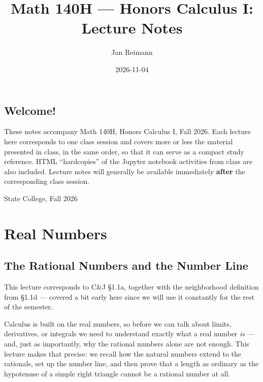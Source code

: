\documentclass[
  letterpaper,
  DIV=11,
  numbers=noendperiod]{scrreprt}
\title{Math 140H --- Honors Calculus I: Lecture Notes}
\author{Jan Reimann}
\date{2026-11-04}
\renewcommand*\contentsname{Table of contents}
\newcommand\contentsname{Table of contents}
\theoremstyle{plain}
\theoremstyle{plain}
\theoremstyle{definition}
\theoremstyle{definition}
\theoremstyle{definition}
\theoremstyle{plain}
\theoremstyle{plain}
\theoremstyle{remark}
\begin{document}
\maketitle

\renewcommand*\contentsname{Table of contents}
{
\setcounter{tocdepth}{1}
\tableofcontents
}


\chapter*{Welcome!}\label{welcome}


These notes accompany Math 140H, Honors Calculus I, Fall 2026. Each
lecture here corresponds to one class session and covers more or less
the material presented in class, in the same order, so that it can serve
as a compact study reference. HTML ``hardcopies'' of the Jupyter
notebook activities from class are also included. Lecture notes will
generally be available immediately \textbf{after} the corresponding
class session.

State College, Fall 2026

\part{Real Numbers}

\chapter{The Rational Numbers and the Number
Line}\label{the-rational-numbers-and-the-number-line}

\begin{tcolorbox}[enhanced jigsaw, arc=.35mm, bottomrule=.15mm, bottomtitle=1mm, breakable, colback=white, colbacktitle=quarto-callout-note-color!10!white, colframe=quarto-callout-note-color-frame, coltitle=black, left=2mm, leftrule=.75mm, opacityback=0, opacitybacktitle=0.6, rightrule=.15mm, title={Companion reading}, titlerule=0mm, toprule=.15mm, toptitle=1mm]

This lecture corresponds to C\&J §1.1a, together with the neighborhood
definition from §1.1d --- covered a bit early here since we will use it
constantly for the rest of the semester.

\end{tcolorbox}

Calculus is built on the real numbers, so before we can talk about
limits, derivatives, or integrals we need to understand exactly what a
real number \emph{is} --- and, just as importantly, why the rational
numbers alone are not enough. This lecture makes that precise: we recall
how the natural numbers extend to the rationals, set up the number line,
and then prove that a length as ordinary as the hypotenuse of a simple
right triangle cannot be a rational number at all.
\end{document}

